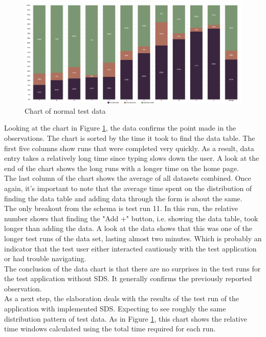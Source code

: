 \begin{figure}[htbp]
    \centerline{
    \includegraphics[width=\linewidth]{images/normal_test_data_chart.png}}
\caption{Chart of normal test data}
\label{test_data_normal}
\end{figure}
Looking at the chart in Figure \ref{test_data_normal}, the data confirms the point made in the observations. The chart is sorted by the time it took to find the data table. The first five columns show runs that were completed very quickly. As a result, data entry takes a relatively long time since typing slows down the user. A look at the end of the chart shows the long runs with a longer time on the home page. \\
The last column of the chart shows the average of all datasets combined. Once again, it's important to note that the average time spent on the distribution of finding the data table and adding data through the form is about the same. \\
The only breakout from the schema is test run 11. In this run, the relative number shows that finding the "Add +" button, i.e. showing the data table, took longer than adding the data. A look at the data shows that this was one of the longer test runs of the data set, lasting almost two minutes. Which is probably an indicator that the test user either interacted cautiously with the test application or had trouble navigating.\\
The conclusion of the data chart is that there are no surprises in the test runs for the test application without SDS. It generally confirms the previously reported observation.\\

As a next step, the elaboration deals with the results of the test run of the application with implemented SDS. Expecting to see roughly the same distribution pattern of test data.  As in Figure \ref{test_data_normal}, this chart shows the relative time windows calculated using the total time required for each run. \\

